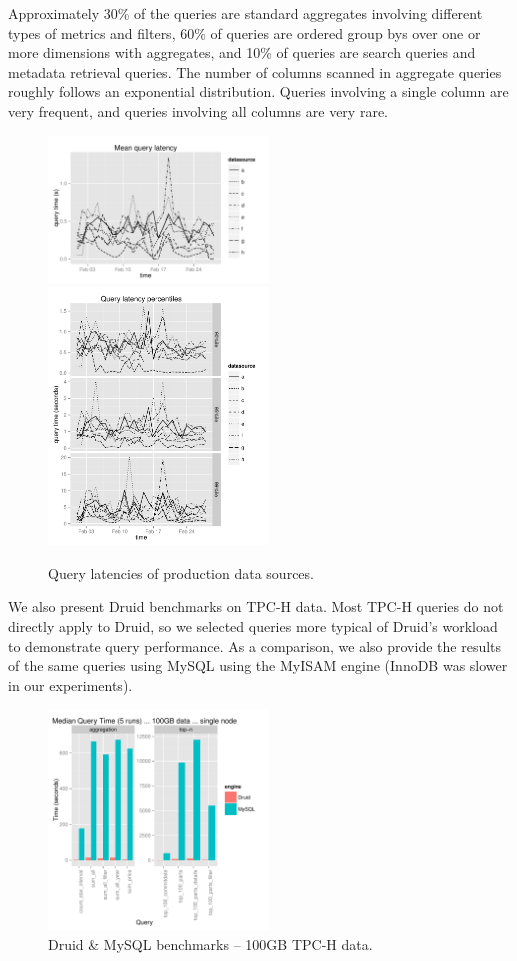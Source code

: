 \documentclass{vldb}
\begin{document}
Approximately 30\% of the queries are standard
aggregates involving different types of metrics and filters, 60\% of queries
are ordered group bys over one or more dimensions with aggregates, and 10\% of
queries are search queries and metadata retrieval queries. The number of
columns scanned in aggregate queries roughly follows an exponential
distribution. Queries involving a single column are very frequent, and queries
involving all columns are very rare.

\begin{figure}
\centering
\includegraphics[width = 2.3in]{avg_query_latency}
\includegraphics[width = 2.3in]{query_percentiles}
\caption{Query latencies of production data sources.}
\label{fig:query_latency}
\end{figure}

We also present Druid benchmarks on TPC-H data.  Most TPC-H queries do
not directly apply to Druid, so we selected queries more typical of Druid's
workload to demonstrate query performance. As a comparison, we also provide the
results of the same queries using MySQL using the MyISAM engine (InnoDB was
slower in our experiments).

\begin{figure}
\centering
\includegraphics[width = 2.3in]{tpch_100gb}
\caption{Druid \& MySQL benchmarks -- 100GB TPC-H data.}
\label{fig:tpch_100gb}
\end{figure}
\end{document}
